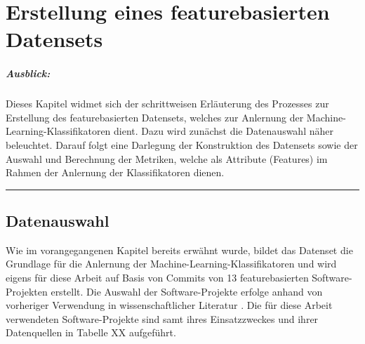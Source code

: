 
\chapter{Erstellung eines featurebasierten Datensets}

\paragraph{Ausblick:}
Dieses Kapitel widmet sich der schrittweisen Erläuterung des Prozesses zur Erstellung des featurebasierten Datensets, welches zur Anlernung der Machine-Learning-Klassifikatoren dient. Dazu wird zunächst die Datenauswahl näher beleuchtet. Darauf folgt eine Darlegung der Konstruktion des Datensets sowie der Auswahl und Berechnung der Metriken, welche als Attribute (Features) im Rahmen der Anlernung der Klassifikatoren dienen.
\\
\hrule

\section{Datenauswahl}

Wie im vorangegangenen Kapitel bereits erwähnt wurde, bildet das Datenset die Grundlage für die Anlernung der Machine-Learning-Klassifikatoren und wird eigens für diese Arbeit auf Basis von Commits von 13 featurebasierten Software-Projekten erstellt. Die Auswahl der Software-Projekte erfolge anhand von vorheriger Verwendung in wissenschaftlicher Literatur \cite{Hunsen2015,Liebig2010,Queiroz2016}. Die für diese Arbeit verwendeten Software-Projekte sind samt ihres Einsatzzweckes und ihrer Datenquellen in Tabelle XX aufgeführt.

